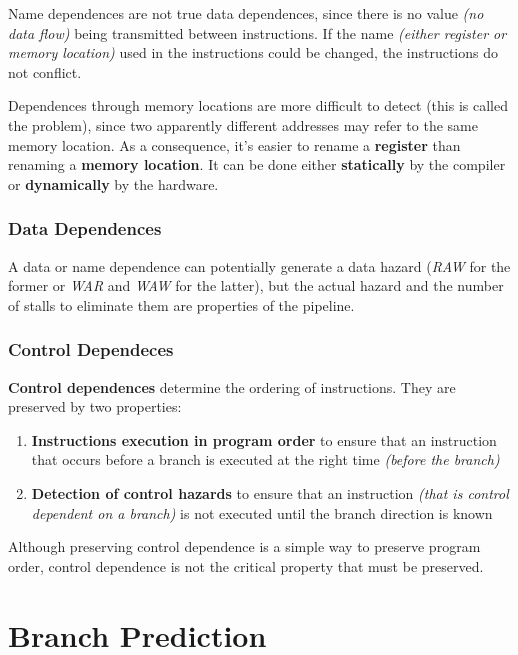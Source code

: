 \documentclass[english]{article}
\begin{document}
Name dependences are not true data dependences, since there is no value \textit{(no data flow)} being transmitted between instructions.
If the name \textit{(either register or memory location)} used in the instructions could be changed, the instructions do not conflict.

Dependences through memory locations are more difficult to detect (this is called the  problem), since two apparently different addresses may refer to the same memory location.
As a consequence, it's easier to rename a \textbf{register} than renaming a \textbf{memory location}.
It can be done either \textbf{statically} by the compiler or \textbf{dynamically} by the hardware.

\subsubsection{Data Dependences}

A data or name dependence can potentially generate a data hazard (\textit{RAW} for the former or \textit{WAR} and \textit{WAW} for the latter), but the actual hazard and the number of stalls to eliminate them are properties of the pipeline.

\subsubsection{Control Dependeces}

\textbf{Control dependences} determine the ordering of instructions.
They are preserved by two properties:

\begin{enumerate}
  \item \textbf{Instructions execution in program order} to ensure that an instruction that occurs before a branch is executed at the right time \textit{(before the branch)}
  \item \textbf{Detection of control hazards} to ensure that an instruction \textit{(that is control dependent on a branch)} is not executed until the branch direction is known
\end{enumerate}

Although preserving control dependence is a simple way to preserve program order, control dependence is not the critical property that must be preserved.

\clearpage

\section{Branch Prediction}
\end{document}
